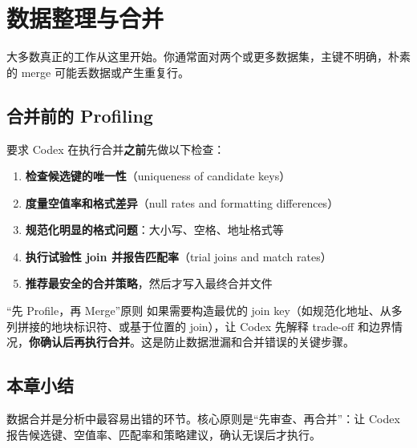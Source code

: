 \section{数据整理与合并}

大多数真正的工作从这里开始。你通常面对两个或更多数据集，主键不明确，朴素的 merge 可能丢数据或产生重复行。

\subsection{合并前的 Profiling}

要求 Codex 在执行合并\textbf{之前}先做以下检查：

\begin{enumerate}[nosep]
    \item \textbf{检查候选键的唯一性}（uniqueness of candidate keys）
    \item \textbf{度量空值率和格式差异}（null rates and formatting differences）
    \item \textbf{规范化明显的格式问题}：大小写、空格、地址格式等
    \item \textbf{执行试验性 join 并报告匹配率}（trial joins and match rates）
    \item \textbf{推荐最安全的合并策略}，然后才写入最终合并文件
\end{enumerate}

\begin{importantbox}{``先 Profile，再 Merge''原则}
如果需要构造最优的 join key（如规范化地址、从多列拼接的地块标识符、或基于位置的 join），让 Codex 先解释 trade-off 和边界情况，\textbf{你确认后再执行合并}。这是防止数据泄漏和合并错误的关键步骤。
\end{importantbox}

\subsection{本章小结}
数据合并是分析中最容易出错的环节。核心原则是``先审查、再合并''：让 Codex 报告候选键、空值率、匹配率和策略建议，确认无误后才执行。

